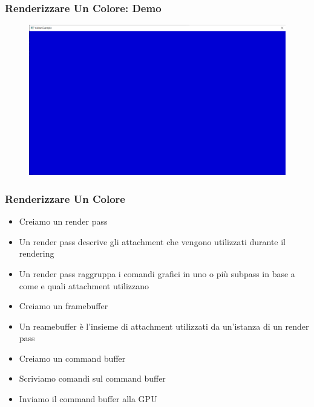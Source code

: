 \begin{frame}
\frametitle{Renderizzare Un Colore: Demo}
\begin{figure}[ht]
    \centering
    \includegraphics[scale=0.25]{images/SlidesClearWindow/ClearWindow.png}
\end{figure}
\end{frame}

\begin{frame}
\frametitle{Renderizzare Un Colore}

\begin{itemize}
\item Creiamo un render pass
\item Un render pass descrive gli attachment che vengono utilizzati durante il rendering
\item Un render pass raggruppa i comandi grafici in uno o più subpass in base a come e quali attachment utilizzano
\item Creiamo un framebuffer
\item Un reamebuffer è l'insieme di attachment utilizzati da un'istanza di un render pass
\item Creiamo un command buffer
\item Scriviamo comandi sul command buffer
\item Inviamo il command buffer alla GPU
\end{itemize}
\end{frame}

